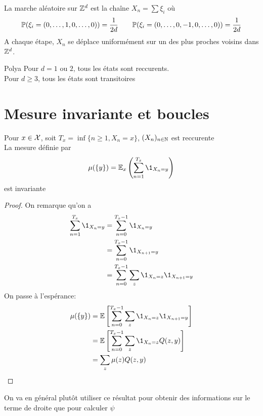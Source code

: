 \documentclass[]{report}
\begin{document}
    \begin{df}{}{}
        La marche aléatoire sur $\mathbb{Z}^d$ est la chaîne $X_n=\sum \xi_i$ où
        \[\mathbb{P}(\xi_i=(0,\ldots,1,0,\ldots,0))=\frac{1}{2d} \qquad \mathbb{P}(\xi_i=(0,\ldots,0,-1,0,\ldots,0))=\frac{1}{2d} \]
        A chaque étape, $X_n$ se déplace uniformément sur un des plus proches voisins dans $\mathbb{Z}^d$.
    \end{df}

    \begin{tm}{Polya}{}
        Pour $d=1$ ou $2$, tous les états sont reccurents.\\
        Pour $d\ge 3$, tous les états sont transitoires
    \end{tm}

    \section{Mesure invariante et boucles}

    \begin{prop}{}{}
        Pour $x\in \mathcal{X}$, soit $T_x=\inf \{n\ge 1,X_n=x\}$, $(X_n)_{n\in\mathbb{N}}$ est reccurente\\
        La mesure définie par
        \[\mu(\{y\})=\Ea_x \left(\sum_{n=1}^{T_x}\1_{X_n=y}\right)\]
        est invariante
    \end{prop}

    \begin{proof}
        On remarque qu'on a
        \begin{align*}
            \sum_{n=1}^{T_x}\1_{X_n=y}&=\sum_{n=0}^{T_x-1}\1_{X_n=y}\\
            &=\sum_{n=0}^{T_x-1}\1_{X_{n+1}=y}\\
            &=\sum_{n=0}^{T_x-1}\sum_z \1_{X_n=z}\1_{X_{n+1}=y}
        \end{align*}
        On passe à l'espérance:
        \begin{align*}
            \mu(\{y\})&=\Ea\left[ \sum_{n=0}^{T_x-1}\sum_z \1_{X_n=z}\1_{X_{n+1}=y}\right]\\
            &=\Ea\left[\sum_{n=0}^{T_x-1} \sum_z \1_{X_n=z}Q(z,y)\right]\\
            &=\sum_z \mu(z) Q(z,y)
        \end{align*}
    \end{proof}

    \begin{re}{}{}
        On va en général plutôt utiliser ce résultat pour obtenir des informations sur le terme de droite que pour calculer $\psi$
    \end{re}
\end{document}
